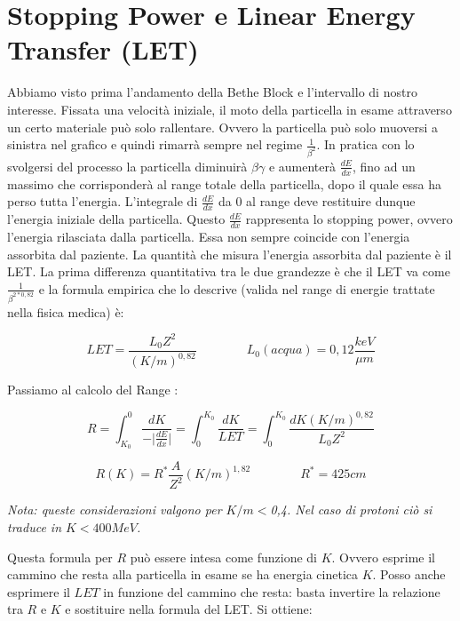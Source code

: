 \newpage

\section{Stopping Power e Linear Energy Transfer (LET)}

Abbiamo visto prima l'andamento della Bethe Block e l'intervallo di nostro interesse. Fissata una velocità iniziale, il moto della particella in esame attraverso un certo materiale può solo rallentare. Ovvero la particella può solo muoversi a sinistra nel grafico e quindi rimarrà sempre nel regime $\frac{1}{\beta^2}$. In pratica con lo svolgersi del processo la particella diminuirà $\beta\gamma$ e aumenterà $\frac{dE}{dx}$, fino ad un massimo che corrisponderà al range totale della particella, dopo il quale essa ha perso tutta l'energia. L'integrale di $\frac{dE}{dx}$ da 0 al range deve restituire dunque l'energia iniziale della particella. 
Questo $\frac{dE}{dx}$ rappresenta lo stopping power, ovvero l'energia rilasciata dalla particella. Essa non sempre coincide con l'energia assorbita dal paziente. La quantità che misura l'energia assorbita dal paziente è il LET. La prima differenza quantitativa tra le due grandezze è che il LET va come $\frac{1}{\beta^{2*0,82}}$ e la formula empirica che lo descrive (valida nel range di energie trattate nella fisica medica) è:

\begin{equation}
LET=\frac{L_0Z^2}{(K/m)^{0,82}} \qquad \qquad L_0(acqua)=0,12 \frac{keV}{\mu m}
\end{equation}

Passiamo al calcolo del Range \cite{Amaldi}:

\begin{equation}
R=\int_{K_0}^0 \frac{dK}{-|{\frac{dE}{dx}|}} =\int_0^{K_0} \frac{dK}{LET} = \int_0^{K_0} \frac{dK (K/m)^{0,82}}{L_0Z^2}  
\end{equation}

\begin{equation}
R(K)=R^*\frac{A}{Z^2}(K/m)^{1,82} \qquad \qquad R^* = 425 cm
\end{equation}

\emph{Nota: queste considerazioni valgono per $K/m<$0,4. Nel caso di protoni ciò si traduce in $K<400 MeV$.}

Questa formula per $R$ può essere intesa come funzione di $K$. Ovvero esprime il cammino che resta alla particella in esame se ha energia cinetica $K$. Posso anche esprimere il $LET$ in funzione del cammino che resta: basta invertire la relazione tra $R$ e $K$ e sostituire nella formula del LET. Si ottiene:

